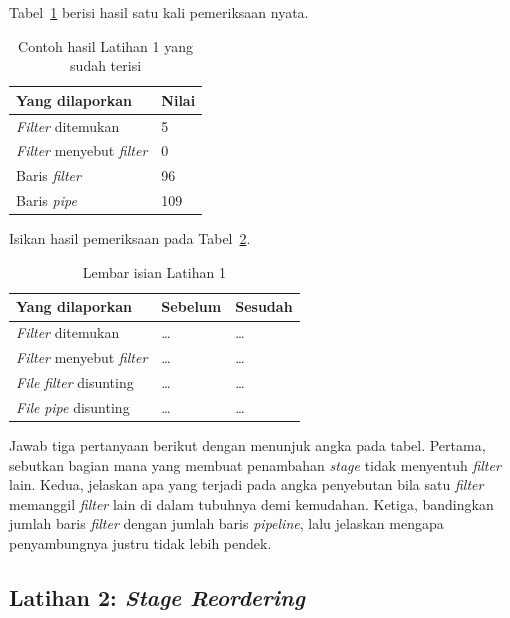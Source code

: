 Tabel~\ref{tab:lat1pipa-contoh} berisi hasil satu kali pemeriksaan nyata.

\begin{table}[htbp]
  \centering
  \caption{Contoh hasil Latihan 1 yang sudah terisi}
  \label{tab:lat1pipa-contoh}
  \begin{tabularx}{\textwidth}{|X|l|}
    \hline
    \textbf{Yang dilaporkan} & \textbf{Nilai} \\
    \hline
    \textit{Filter} ditemukan & 5 \\
    \hline
    \textit{Filter} menyebut \textit{filter} & 0 \\
    \hline
    Baris \textit{filter} & 96 \\
    \hline
    Baris \textit{pipe} & 109 \\
    \hline
  \end{tabularx}
\end{table}

Isikan hasil pemeriksaan pada Tabel~\ref{tab:lat1pipa-hasil}.

\begin{table}[htbp]
  \centering
  \caption{Lembar isian Latihan 1}
  \label{tab:lat1pipa-hasil}
  \begin{tabularx}{\textwidth}{|X|l|l|}
    \hline
    \textbf{Yang dilaporkan} & \textbf{Sebelum} & \textbf{Sesudah} \\
    \hline
    \textit{Filter} ditemukan & \dots & \dots \\
    \hline
    \textit{Filter} menyebut \textit{filter} & \dots & \dots \\
    \hline
    \textit{File} \textit{filter} disunting & \dots & \dots \\
    \hline
    \textit{File} \textit{pipe} disunting & \dots & \dots \\
    \hline
  \end{tabularx}
\end{table}

Jawab tiga pertanyaan berikut dengan menunjuk angka pada tabel. Pertama,
sebutkan bagian mana yang membuat penambahan \textit{stage} tidak menyentuh \textit{filter}
lain. Kedua, jelaskan apa yang terjadi pada angka penyebutan bila satu \textit{filter}
memanggil \textit{filter} lain di dalam tubuhnya demi kemudahan. Ketiga, bandingkan
jumlah baris \textit{filter} dengan jumlah baris \textit{pipeline}, lalu jelaskan mengapa
penyambungnya justru tidak lebih pendek.

\subsection*{Latihan 2: \textit{Stage Reordering}}

